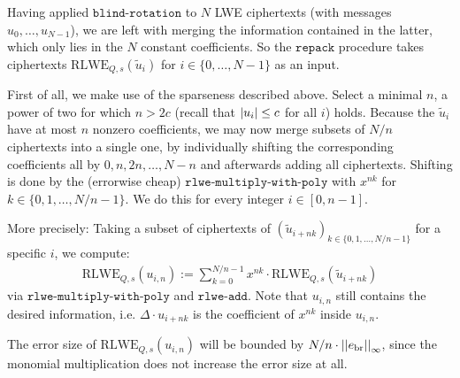 \documentclass[letterpaper,10pt,english]{jupyterBook}
\begin{document}
\sphinxAtStartPar
Having applied \(\texttt{blind-rotation}\) to \(N\) LWE ciphertexts (with messages \(u_0,\dots,u_{N-1}\)), we are left with merging the information contained in the latter, which only lies in the \(N\) constant coefficients.
So the \(\texttt{repack}\) procedure takes ciphertexts \(\mathrm{RLWE}_{Q,s}(\tilde u_i)\) for \(i \in \{0,\dots,N-1\}\) as an input.

\begin{DUlineblock}{0em}
\item[] 
\end{DUlineblock}

\sphinxAtStartPar
First of all, we make use of the sparseness described above.
Select a minimal \(n\), a power of two for which \(n > 2c\) (recall that \(\left\lvert u_i \right\rvert \le c\) for all \(i\)) holds.
Because the \(\tilde u_i\) have at most \(n\) non\sphinxhyphen{}zero coefficients, we may now merge subsets of \(N/n\) ciphertexts into a single one, by individually shifting the corresponding coefficients all by \(0,n,2n,\dots,N-n\) and afterwards adding all ciphertexts.
Shifting is done by the (error\sphinxhyphen{}wise cheap) \(\texttt{rlwe-multiply-with-poly}\) with \(x^{nk}\) for \(k \in \{0,1,\dots,N/n-1\}\). We do this for every integer \(i \in [0,n-1]\).

\sphinxAtStartPar
More precisely: Taking a subset of ciphertexts of \((\tilde u_{i+nk})_{k \in \{0,1,\dots,N/n-1\}}\) for a specific \(i\), we compute:
\begin{equation*}
\begin{split}\mathrm{RLWE}_{Q,s}(u_{i,n}) := \sum_{k=0}^{N/n-1} x^{nk} \cdot \mathrm{RLWE}_{Q,s}(\tilde u_{i+nk})\end{split}
\end{equation*}
\sphinxAtStartPar
via \(\texttt{rlwe-multiply-with-poly}\) and \(\texttt{rlwe-add}\).
Note that \(u_{i,n}\) still contains the desired information, i.e. \(\Delta \cdot u_{i+nk}\) is the coefficient of \(x^{nk}\) inside \(u_{i,n}\).

\sphinxAtStartPar
The error size of \(\mathrm{RLWE}_{Q,s}(u_{i,n})\) will be bounded by \(N/n \cdot \left\lvert\left\lvert  e_{\text{br}} \right\rvert\right\rvert_\infty\), since the monomial multiplication does not increase the error size at all.

\begin{DUlineblock}{0em}
\item[] 
\end{DUlineblock}
\end{document}
